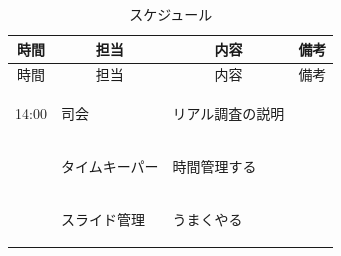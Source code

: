 \begin{longtable}[c]{|p{}|p{}|p{}|p{}|}
  \caption{スケジュール} \\
  \hline
  \multicolumn{1}{|c|}{時間} & \multicolumn{1}{c|}{担当} & \multicolumn{1}{c|}{内容} & \multicolumn{1}{c|}{備考} \\
  \hline
  \endfirsthead
  
  \hline
  \multicolumn{1}{|c|}{時間} & \multicolumn{1}{c|}{担当} & \multicolumn{1}{c|}{内容} & \multicolumn{1}{c|}{備考} \\
  \hline
  \endhead
  
  \hline
  \endfoot
  
  \hline
  \endlastfoot
  
  \begin{tpacol}
    14:00
  \end{tpacol}&
  \begin{tpbcol}
    司会
  \end{tpbcol}&
  \begin{tpccol}
    リアル調査の説明
  \end{tpccol}&
  \begin{tpdcol}
  \end{tpdcol}\\

  \begin{tpacol}
    
  \end{tpacol}&
  \begin{tpbcol}
    タイムキーパー
  \end{tpbcol}&
  \begin{tpccol}
    時間管理する
  \end{tpccol}&
  \begin{tpdcol}
  \end{tpdcol}\\

  \begin{tpacol}
    
  \end{tpacol}&
  \begin{tpbcol}
    スライド管理
  \end{tpbcol}&
  \begin{tpccol}
    うまくやる
  \end{tpccol}&
  \begin{tpdcol}
  \end{tpdcol}\\

\end{longtable}
\normalsize


